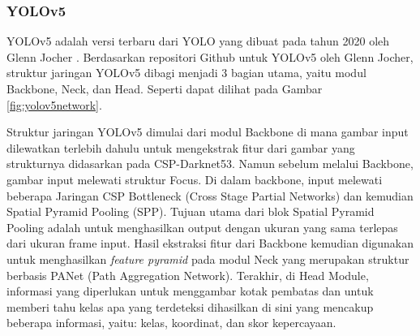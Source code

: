 \subsubsection{YOLOv5}
\label{subsecsec:yolov5}



\par YOLOv5 adalah versi terbaru dari YOLO yang dibuat pada tahun 2020 oleh Glenn Jocher \cite{glenn_jocher_yolov5}. Berdasarkan repositori Github untuk YOLOv5 oleh Glenn Jocher, struktur jaringan YOLOv5 dibagi menjadi 3 bagian utama, yaitu modul Backbone, Neck, dan Head. Seperti dapat dilihat pada Gambar \ref{fig:yolov5network}.

\par Struktur jaringan YOLOv5 dimulai dari modul Backbone di mana gambar input dilewatkan terlebih dahulu untuk mengekstrak fitur dari gambar yang strukturnya didasarkan pada CSP-Darknet53. Namun sebelum melalui Backbone, gambar input melewati struktur Focus. Di dalam backbone, input melewati beberapa Jaringan CSP Bottleneck (Cross Stage Partial Networks) dan kemudian Spatial Pyramid Pooling (SPP). Tujuan utama dari blok Spatial Pyramid Pooling adalah untuk menghasilkan output dengan ukuran yang sama terlepas dari ukuran frame input. Hasil ekstraksi fitur dari Backbone kemudian digunakan untuk menghasilkan \emph{feature pyramid} pada modul Neck yang merupakan struktur berbasis PANet (Path Aggregation Network). Terakhir, di Head Module, informasi yang diperlukan untuk menggambar kotak pembatas dan untuk memberi tahu kelas apa yang terdeteksi dihasilkan di sini yang mencakup beberapa informasi, yaitu: kelas, koordinat, dan skor kepercayaan.

